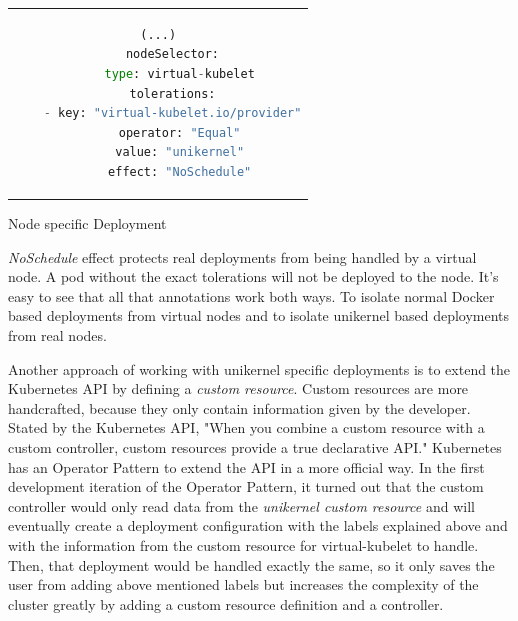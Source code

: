 \begin{code}[htpb]
  \centering
  \begin{tabular}{c}
  \begin{lstlisting}[language=python]
    (...)
    nodeSelector:
      type: virtual-kubelet
    tolerations:
    - key: "virtual-kubelet.io/provider"
      operator: "Equal"
      value: "unikernel"
      effect: "NoSchedule"
\end{lstlisting}
\end{tabular}
\caption{Node specific Deployment}\label{fig:deployment}
\end{code}
\textit{NoSchedule} effect protects real deployments from being handled by a virtual node. A pod without the exact tolerations will not be deployed to the node. It's easy to see that all that annotations work both ways. To isolate normal Docker based deployments from virtual nodes and to isolate unikernel based deployments from real nodes.

Another approach of working with unikernel specific deployments is to extend the Kubernetes API by defining a \textit{custom resource}. Custom resources are more handcrafted, because they only contain information given by the developer. Stated by the Kubernetes API, "When you combine a custom resource with a custom controller, custom resources provide a true declarative API." Kubernetes has an Operator Pattern to extend the API in a more official way. In the first development iteration of the Operator Pattern, it turned out that the custom controller would only read data from the \textit{unikernel custom resource} and will eventually create a deployment configuration with the labels explained above and with the information from the custom resource for virtual-kubelet to handle. Then, that deployment would be handled exactly the same, so it only saves the user from adding above mentioned labels but increases the complexity of the cluster greatly by adding a custom resource definition and a controller.

